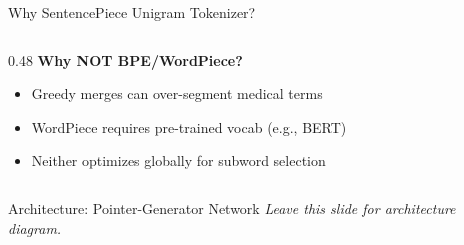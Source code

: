 \documentclass[10pt, aspectratio=169]{beamer}
\begin{document}
\begin{frame}{Why SentencePiece Unigram Tokenizer?}
\begin{columns}[T]
\begin{column}{0.48\textwidth}
      \vspace{0.1cm}
      \textbf{Why NOT BPE/WordPiece?}
      \begin{itemize}\setlength{\itemsep}{0pt}
        \item Greedy merges can over-segment medical terms
        \item WordPiece requires pre-trained vocab (e.g., BERT)
        \item Neither optimizes globally for subword selection
      \end{itemize}
    \end{column}
  \end{columns}
\end{frame}

\begin{frame}{Architecture: Pointer-Generator Network}
  \vspace{-0.2cm}
  {\small \textit{Leave this slide for architecture diagram.}}
\end{frame}
\end{document}
